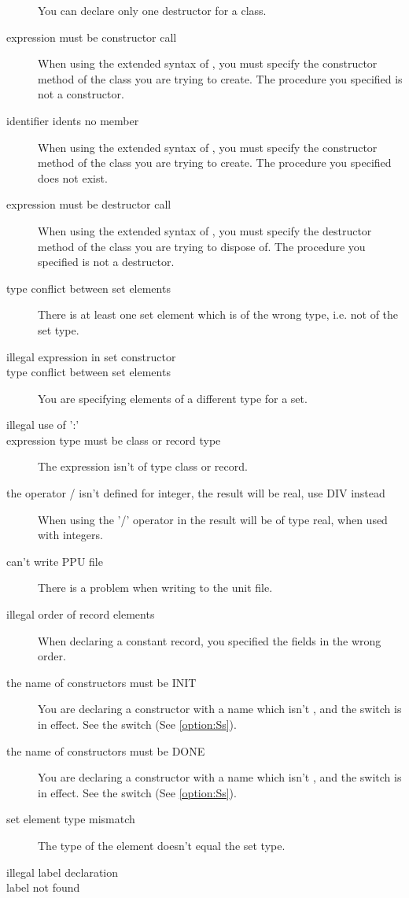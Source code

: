 \documentclass{report}
\newcommand{\seeo}[1]{See \ref{option:#1}}
\begin{document}
\begin{description}
You can declare only one destructor for a class.
\item [expression must be constructor call]
When using the extended syntax of , you must specify the constructor
method of the class you are trying to create. The procedure you specified
is not a constructor.
\item [identifier idents no member]
When using the extended syntax of , you must specify the constructor
method of the class you are trying to create. The procedure you specified
does not exist.
\item [expression must be destructor call]
When using the extended syntax of , you must specify the
destructor method of the class you are trying to dispose of. 
The procedure you specified is not a destructor.
\item [type conflict between set elements]
There is at least one set element which is of the wrong type, i.e. not of
the set type.
\item [illegal expression in set constructor]
\item [type conflict between set elements]
You are specifying elements of a different type for a set.
\item [illegal use of ':']
\item [expression type must be class or record type]
The expression isn't of type class or record.
\item [the operator / isn't defined for integer, the result will be real, use DIV instead]
When using the '/' operator in \fpc the result will be of type real, when
used with integers.
\item [can't write PPU file]
There is a problem when writing to the unit file.
\item [illegal order of record elements]
When declaring a constant record, you specified the fields in the wrong
order.
\item [the name of constructors must be INIT]
You are declaring a constructor with a name which isn't , and the
 switch is in effect. See the  switch (\seeo{Ss}). 
\item [the name of constructors must be DONE]
You are declaring a constructor with a name which isn't , and the
 switch is in effect. See the  switch (\seeo{Ss}). 
\item [set element type mismatch]
The type of the element doesn't equal the set type.
\item [illegal label declaration]
\item [label not found]

\end{description}
\end{document}
